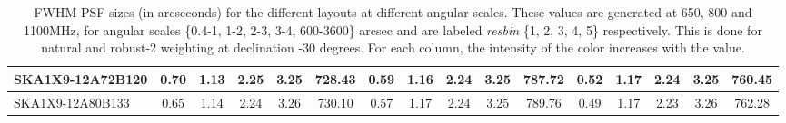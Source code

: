 \begin{table}[htp]
{{\begin{tabular}{|lccccc||ccccc||ccccc|}
SKA1X9-12A72B120 & 0.70 \cellcolor{blue!27.88} & 1.13 \cellcolor{red!18.00} & 2.25 \cellcolor{green!60.00} & 3.25 \cellcolor{orange!25.22} & 728.43 \cellcolor{purple!18.00} & 0.59 \cellcolor{blue!23.48} & 1.16 \cellcolor{red!36.56} & 2.24 \cellcolor{green!22.97} & 3.25 \cellcolor{orange!49.15} & 787.72 \cellcolor{purple!18.00} & 0.52 \cellcolor{blue!35.67} & 1.17 \cellcolor{red!55.05} & 2.24 \cellcolor{green!58.05} & 3.25 \cellcolor{orange!18.00} & 760.45 \cellcolor{purple!45.13}\\ \hline 
SKA1X9-12A80B133 & 0.65 \cellcolor{blue!18.00} & 1.14 \cellcolor{red!20.99} & 2.24 \cellcolor{green!51.69} & 3.26 \cellcolor{orange!60.00} & 730.10 \cellcolor{purple!25.73} & 0.57 \cellcolor{blue!18.00} & 1.17 \cellcolor{red!45.98} & 2.24 \cellcolor{green!60.00} & 3.25 \cellcolor{orange!46.00} & 789.76 \cellcolor{purple!47.00} & 0.49 \cellcolor{blue!18.00} & 1.17 \cellcolor{red!51.12} & 2.23 \cellcolor{green!27.12} & 3.26 \cellcolor{orange!56.33} & 762.28 \cellcolor{purple!60.00}\\ \hline 
\end{tabular}}
\vspace{-0.300000cm}
\hspace{1cm} 

\vspace{.25cm}
\caption{FWHM PSF sizes (in arcseconds) for the different layouts at different angular scales. These values are generated at 650, 800 and 1100MHz, for angular scales \{0.4-1, 1-2, 2-3, 3-4, 600-3600\} arcsec and are labeled {\it resbin} \{1, 2, 3, 4, 5\} respectively. This is done for natural and robust-2 weighting at declination -30 degrees. For each column, the intensity of the color increases with the value.}\label{tab:psf_mean}}
 \end{table}
